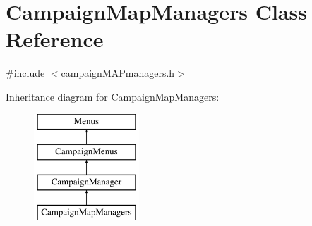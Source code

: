 \hypertarget{class_campaign_map_managers}{}\section{Campaign\+Map\+Managers Class Reference}
\label{class_campaign_map_managers}


{\ttfamily \#include $<$campaign\+M\+A\+Pmanagers.\+h$>$}

Inheritance diagram for Campaign\+Map\+Managers\+:\begin{figure}[H]
\begin{center}
\leavevmode
\includegraphics[height=4.000000cm]{class_campaign_map_managers}
\end{center}
\end{figure}
